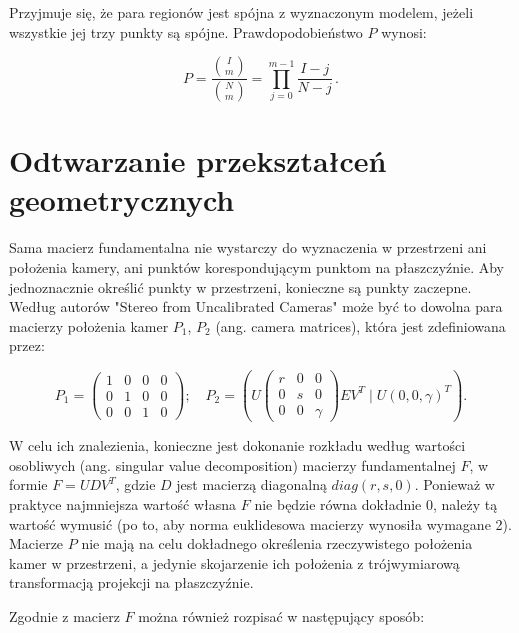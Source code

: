 Przyjmuje się, że para regionów jest spójna z wyznaczonym modelem, jeżeli
wszystkie jej trzy punkty są spójne. Prawdopodobieństwo $P$ wynosi: 

\begin{equation} P = \frac{{I \choose m}}{{N \choose m}} =
  \prod_{j=0}^{m-1}\frac{I - j}{N-j} \,.  \end{equation}

\section{Odtwarzanie przekształceń geometrycznych}

Sama macierz fundamentalna nie wystarczy do wyznaczenia w przestrzeni ani
położenia kamery, ani punktów korespondującym punktom na płaszczyźnie. Aby
jednoznacznie określić punkty w przestrzeni, konieczne są punkty zaczepne.
Według autorów "Stereo from Uncalibrated Cameras" \cite{stereo} może być to
dowolna para macierzy położenia kamer $P_1$, $P_2$ (ang. camera matrices),
która jest zdefiniowana przez:

\begin{equation}
  P_1 = \begin{pmatrix} 
    1 & 0 & 0 & 0 \\
    0 & 1 & 0 & 0 \\
    0 & 0 & 1 & 0
  \end{pmatrix}
;\quad P_2 = (U \begin{pmatrix} 
    r & 0 & 0 \\
    0 & s & 0 \\
    0 & 0 & \gamma
  \end{pmatrix} E V^T\; |\; U(0,0,\gamma)^T).
\end{equation}

W celu ich znalezienia, konieczne jest dokonanie rozkładu według wartości
osobliwych (ang. singular value decomposition) macierzy fundamentalnej $F$, w
formie $F = UDV^T$, gdzie $D$ jest macierzą diagonalną $diag(r,s,0)$. Ponieważ
w praktyce najmniejsza wartość własna $F$ nie będzie równa dokładnie 0, należy
tą wartość wymusić (po to, aby norma euklidesowa macierzy wynosiła wymagane 2).
Macierze $P$ nie mają na celu dokładnego określenia rzeczywistego położenia
kamer w przestrzeni, a jedynie skojarzenie ich położenia z trójwymiarową
transformacją projekcji na płaszczyźnie.

Zgodnie z \cite{stereo} macierz $F$ można również rozpisać w następujący sposób:

